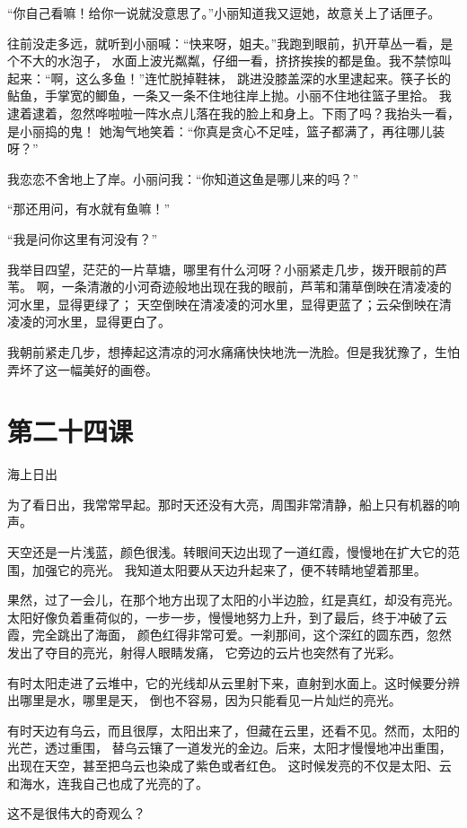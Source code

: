 \documentclass[12pt,UTF8]{ctexbook}
\begin{document}
“你自己看嘛！给你一说就没意思了。”小丽知道我又逗她，故意关上了话匣子。

往前没走多远，就听到小丽喊：“快来呀，姐夫。”我跑到眼前，扒开草丛一看，是个不大的水泡子，
水面上波光粼粼，仔细一看，挤挤挨挨的都是鱼。我不禁惊叫起来：“啊，这么多鱼！”连忙脱掉鞋袜，
跳进没膝盖深的水里逮起来。筷子长的鲇鱼，手掌宽的鲫鱼，一条又一条不住地往岸上抛。小丽不住地往篮子里拾。
我逮着逮着，忽然哗啦啦一阵水点儿落在我的脸上和身上。下雨了吗？我抬头一看，是小丽捣的鬼！
她淘气地笑着：“你真是贪心不足哇，篮子都满了，再往哪儿装呀？”

我恋恋不舍地上了岸。小丽问我：“你知道这鱼是哪儿来的吗？”

“那还用问，有水就有鱼嘛！”

“我是问你这里有河没有？”

我举目四望，茫茫的一片草塘，哪里有什么河呀？小丽紧走几步，拨开眼前的芦苇。
啊，一条清澈的小河奇迹般地出现在我的眼前，芦苇和蒲草倒映在清凌凌的河水里，显得更绿了；
天空倒映在清凌凌的河水里，显得更蓝了；云朵倒映在清凌凌的河水里，显得更白了。

我朝前紧走几步，想捧起这清凉的河水痛痛快快地洗一洗脸。但是我犹豫了，生怕弄坏了这一幅美好的画卷。

\section{第二十四课}

海上日出

为了看日出，我常常早起。那时天还没有大亮，周围非常清静，船上只有机器的响声。

天空还是一片浅蓝，颜色很浅。转眼间天边出现了一道红霞，慢慢地在扩大它的范围，加强它的亮光。
我知道太阳要从天边升起来了，便不转睛地望着那里。

果然，过了一会儿，在那个地方出现了太阳的小半边脸，红是真红，却没有亮光。
太阳好像负着重荷似的，一步一步，慢慢地努力上升，到了最后，终于冲破了云霞，完全跳出了海面，
颜色红得非常可爱。一刹那间，这个深红的圆东西，忽然发出了夺目的亮光，射得人眼睛发痛，
它旁边的云片也突然有了光彩。

有时太阳走进了云堆中，它的光线却从云里射下来，直射到水面上。这时候要分辨出哪里是水，哪里是天，
倒也不容易，因为只能看见一片灿烂的亮光。

有时天边有乌云，而且很厚，太阳出来了，但藏在云里，还看不见。然而，太阳的光芒，透过重围，
替乌云镶了一道发光的金边。后来，太阳才慢慢地冲出重围，出现在天空，甚至把乌云也染成了紫色或者红色。
这时候发亮的不仅是太阳、云和海水，连我自己也成了光亮的了。

这不是很伟大的奇观么？
\end{document}
